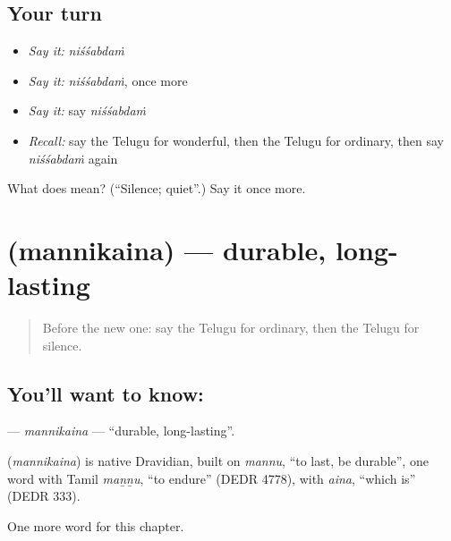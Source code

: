 \subsection*{Your turn}
\begin{itemize}
\raggedright
  \item \emph{Say it:} \emph{niśśabdaṁ}
  \item \emph{Say it:} \emph{niśśabdaṁ}, once more
  \item \emph{Say it:} say \emph{niśśabdaṁ}
  \item \emph{Recall:} say the Telugu for wonderful, then the Telugu for ordinary, then say \emph{niśśabdaṁ} again
\end{itemize}

\begin{tcolorbox}[breakable,colback=teal!4,colframe=teal!35!black,title={Before you move on}]
What does  mean? (\textquotedblleft{}Silence; quiet\textquotedblright{}.) Say it once more.
\end{tcolorbox}
\section[\texorpdfstring{\te{మన్నికైన} (mannikaina)}{మన్నికైన (mannikaina)}]{ (mannikaina) — durable, long-lasting}

\label{lesson:TE-C182-mannikaina}



\begin{quote}
Before the new one: say the Telugu for ordinary, then the Telugu for silence.
\end{quote}

\subsection*{You'll want to know: }
\textbf{} — \emph{mannikaina} — \textquotedblleft{}durable, long-lasting\textquotedblright{}.

\begin{cousinweb}
\textbf{} (\emph{mannikaina}) is native Dravidian, built on \emph{mannu}, \textquotedblleft{}to last, be durable\textquotedblright{}, one word with Tamil \emph{maṉṉu}, \textquotedblleft{}to endure\textquotedblright{} (DEDR 4778), with \emph{aina}, \textquotedblleft{}which is\textquotedblright{} (DEDR 333).
\end{cousinweb}

\begin{grammarlens}[title={What you've built}]
One more word for this chapter.
\end{grammarlens}

